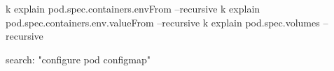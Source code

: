 \begin{tcbitemize}[
  raster columns=3, raster equal height=rows,
  blanker, cheat subtitle
]
    \begin{cheatcodebash}
    k explain pod.spec.containers.envFrom --recursive
    k explain pod.spec.containers.env.valueFrom --recursive
    k explain pod.spec.volumes --recursive
    \end{cheatcodebash}

    \begin{cheatcodebash}
    search: "configure pod configmap"
    \end{cheatcodebash}

\end{tcbitemize}

